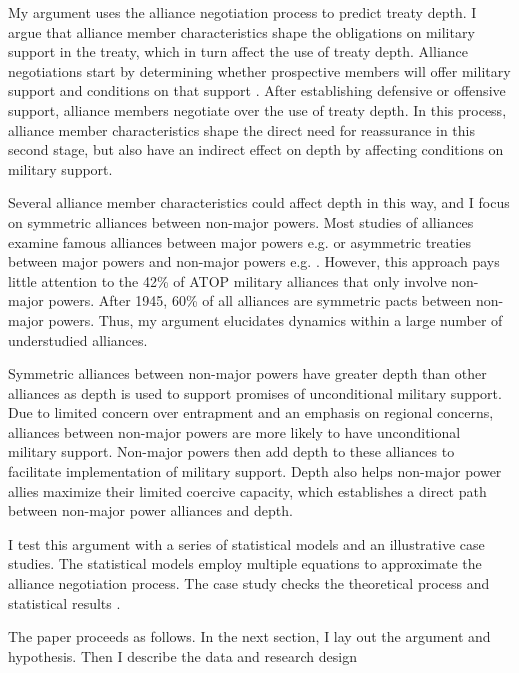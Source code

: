 \documentclass[12pt]{article}
\begin{document}
My argument uses the alliance negotiation process to predict treaty depth. 
I argue that alliance member characteristics shape the obligations on military support in the treaty, which in turn affect the use of treaty depth. 
Alliance negotiations start by determining whether prospective members will offer military support and conditions on that support \citep{Poast2019a}. 
After establishing defensive or offensive support, alliance members negotiate over the use of treaty depth. 
In this process, alliance member characteristics shape the direct need for reassurance in this second stage, but also have an indirect effect on depth by affecting conditions on military support. 


Several alliance member characteristics could affect depth in this way, and I focus on symmetric alliances between non-major powers. 
Most studies of alliances examine famous alliances between major powers e.g. \citep{Snyder1997} or asymmetric treaties between major powers and non-major powers e.g. \citep{Morrow1991, Yarhi-Miloetal2016}. 
However, this approach pays little attention to the 42\% of ATOP military alliances that only involve non-major powers. %
After 1945, 60\% of all alliances are symmetric pacts between non-major powers. %
Thus, my argument elucidates dynamics within a large number of understudied alliances. 

Symmetric alliances between non-major powers have greater depth than other alliances as depth is used to support promises of unconditional military support. 
Due to limited concern over entrapment and an emphasis on regional concerns, alliances between non-major powers are more likely to have unconditional military support. 
Non-major powers then add depth to these alliances to facilitate implementation of military support. %
Depth also helps non-major power allies maximize their limited coercive capacity, which establishes a direct path between non-major power alliances and depth. %


I test this argument with a series of statistical models and an illustrative case studies.
The statistical models employ multiple equations to approximate the alliance negotiation process. 
The case study checks the theoretical process and statistical results \citep{Seawright2016}.  


The paper proceeds as follows. 
In the next section, I lay out the argument and hypothesis. 
Then I describe the data and research design 
\end{document}
